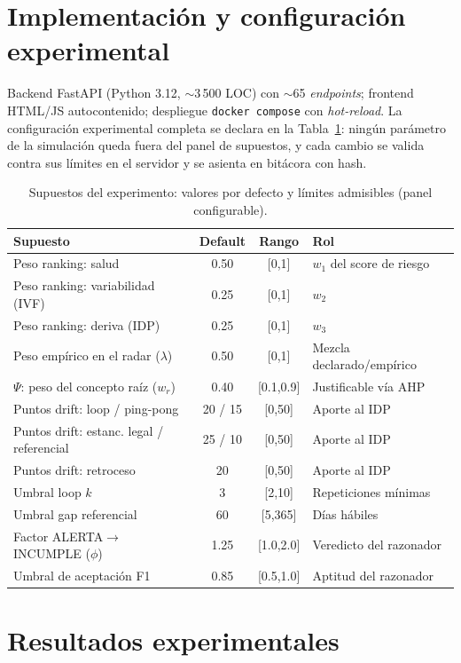 \documentclass[a4paper,openany,12pt]{book}
\begin{document}
\section{Implementación y configuración experimental}
Backend FastAPI (Python 3.12, $\sim$3\,500 LOC) con $\sim$65 \textit{endpoints}; frontend HTML/JS autocontenido; despliegue \texttt{docker compose} con \textit{hot-reload}. La configuración experimental completa se declara en la Tabla~\ref{tab:supuestos}: ningún parámetro de la simulación queda fuera del panel de supuestos, y cada cambio se valida contra sus límites en el servidor y se asienta en bitácora con hash.
\begin{table}[H]\centering\footnotesize
\caption{Supuestos del experimento: valores por defecto y límites admisibles (panel configurable).}\label{tab:supuestos}
\begin{tabular}{p{4.6cm}ccp{4.6cm}}\toprule
\textbf{Supuesto} & \textbf{Default} & \textbf{Rango} & \textbf{Rol} \\ \midrule
Peso ranking: salud & 0.50 & [0,1] & $w_1$ del score de riesgo \\
Peso ranking: variabilidad (IVF) & 0.25 & [0,1] & $w_2$ \\
Peso ranking: deriva (IDP) & 0.25 & [0,1] & $w_3$ \\
Peso empírico en el radar ($\lambda$) & 0.50 & [0,1] & Mezcla declarado/empírico \\
$\Psi$: peso del concepto raíz ($w_r$) & 0.40 & [0.1,0.9] & Justificable vía AHP \\
Puntos drift: loop / ping-pong & 20 / 15 & [0,50] & Aporte al IDP \\
Puntos drift: estanc. legal / referencial & 25 / 10 & [0,50] & Aporte al IDP \\
Puntos drift: retroceso & 20 & [0,50] & Aporte al IDP \\
Umbral loop $k$ & 3 & [2,10] & Repeticiones mínimas \\
Umbral gap referencial & 60 & [5,365] & Días hábiles \\
Factor ALERTA$\to$INCUMPLE ($\phi$) & 1.25 & [1.0,2.0] & Veredicto del razonador \\
Umbral de aceptación F1 & 0.85 & [0.5,1.0] & Aptitud del razonador \\ \bottomrule
\end{tabular}\end{table}

\section{Resultados experimentales}
\end{document}
